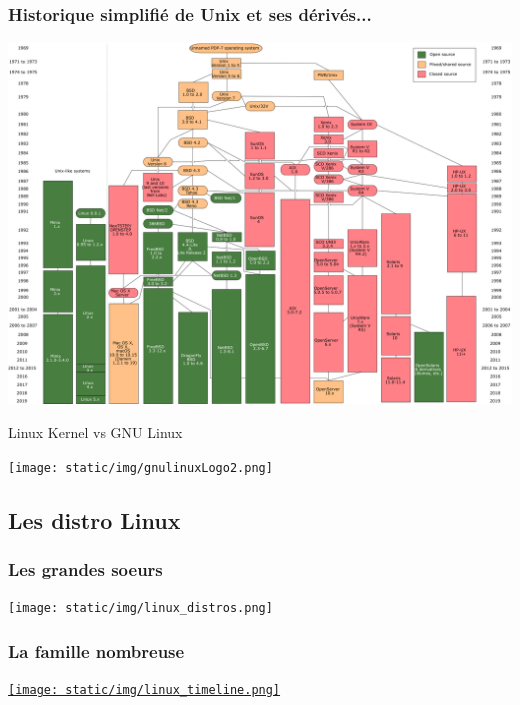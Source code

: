 \documentclass{beamer}
\begin{document}
\begin{frame}
	\frametitle{Historique simplifié de Unix et ses dérivés...}
	
	\begin{center}
		\includegraphics[width=\linewidth]{static/img/Unix_history-simple.png}
	\end{center}
\end{frame}

\begin{frame}
	\begin{center}
		Linux Kernel vs GNU Linux
		
		\texttt{[image: static/img/gnulinuxLogo2.png]}
	\end{center}
\end{frame}

\subsection{Les distro Linux}

\begin{frame}
	\frametitle{Les grandes soeurs}
	
	\begin{center}
		\texttt{[image: static/img/linux\_distros.png]}
	\end{center}
\end{frame}

\begin{frame}
	\frametitle{La famille nombreuse}
	
	\begin{center}
		\href{https://upload.wikimedia.org/wikipedia/commons/1/1b/Linux_Distribution_Timeline.svg}{\texttt{[image: static/img/linux\_timeline.png]}}
	\end{center}
\end{frame}
\end{document}
